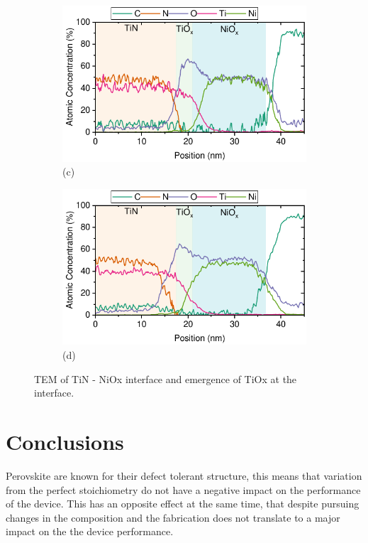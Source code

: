 \begin{figure}[htbp]
    \begin{subfigure}[t]{0.49\textwidth}
        \centering
        \includegraphics[width=\textwidth]{chapters/material_properties/images/TEM_30_min.pdf} %
        \caption*{(c)}
    \end{subfigure}
    \hfill
    \begin{subfigure}[t]{0.49\textwidth}
        \centering
        \includegraphics[width=\textwidth]{chapters/material_properties/images/TEM_60_min.pdf} %
        \caption*{(d)}
    \end{subfigure}
    \caption{TEM of TiN - NiOx interface and emergence of TiOx at the interface.}
    \label{fig:ch2:tem_pix_substrate}
\end{figure}

\section{Conclusions}

Perovskite are known for their defect tolerant structure, this means that variation from the perfect stoichiometry do not have a negative impact on the performance of the device. This has an opposite effect at the same time, that despite pursuing changes in the composition and the fabrication does not translate to a major impact on the the device performance. 



\cleardoublepage

